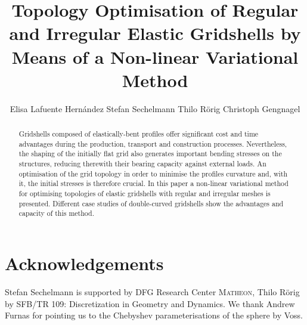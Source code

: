 \documentclass[twoside]{article}
\begin{document}
\title{Topology Optimisation of Regular and Irregular Elastic Gridshells by Means of a Non-linear Variational Method}

\author{Elisa Lafuente Hern\'andez 
Stefan Sechelmann
Thilo R\"orig
Christoph Gengnagel
}

\maketitle
\def\shortauthor{E. Lafuente Hern\'andez, S. Sechelmann, T. R\"orig and C. Gengnagel}  %
\def\shorttitle{Topology Optimisation of Elastic Gridshells}   %

\begin{abstract}
Gridshells composed of elastically-bent profiles offer significant cost and time advantages during the production, transport and construction processes. Nevertheless, the shaping of the initially flat grid also generates important bending stresses on the structures, reducing therewith their bearing capacity against external loads. An optimisation of the grid topology in order to minimise the profiles curvature and, with it, the initial stresses is therefore crucial. In this paper a non-linear variational method for optimising topologies of elastic gridshells with regular and irregular meshes is presented. Different case studies of double-curved gridshells show the advantages and capacity of this method.  
\end{abstract}
\ifreviewing\else
\fi







\ifreviewing\else
\section*{Acknowledgements}
Stefan Sechelmann is supported by DFG Research Center \textsc{Matheon}, Thilo R\"orig by SFB/TR 109: Discretization in Geometry and Dynamics.
We thank Andrew Furnas for pointing us to the Chebyshev parameterisations of the sphere by Voss. 
\fi

\nocite{*}

\end{document}

